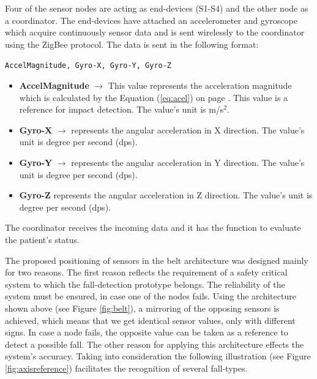 \documentclass[conference]{IEEEtran}
\theoremstyle{definition}
\begin{document}
Four of the sensor nodes are acting as end-devices (S1-S4) and the other node as a coordinator. 
The end-devices have attached an accelerometer and gyroscope which acquire continuously sensor 
data and is sent wirelessly to the coordinator using the ZigBee protocol. The data is sent in the following format:
 \begin{center}
  \texttt{AccelMagnitude, Gyro-X, Gyro-Y, Gyro-Z}
 \end{center}
\begin{itemize}
  \item \textbf{AccelMagnitude} $\rightarrow$ This value represents the acceleration magnitude which is calculated 
  by the Equation (\ref{eq:acel}) on page \pageref{eq:acel}. This value is a reference for impact detection. 
  The value's unit is m/s$^2$.
  \item \textbf{Gyro-X} $\rightarrow$ represents the angular acceleration in X direction. The value's unit is 
  degree per second (dps).
  \item \textbf{Gyro-Y} $\rightarrow$ represents the angular acceleration in Y direction. The value's unit is 
  degree per second (dps).
  \item \textbf{Gyro-Z} represents the angular acceleration in Z direction. The value's unit is degree per second (dps).
\end{itemize}
The coordinator receives the incoming data and it has the function to evaluate the patient's status.

The proposed positioning of sensors in the belt architecture was designed mainly for two reasons. The first reason 
reflects the requirement of a safety critical system to which the fall-detection prototype belongs. The reliability 
of the system must be ensured, in case one of the nodes fails. Using the architecture shown above (see Figure \ref{fig:belt}), 
a mirroring of the opposing sensors is achieved, which means that we get identical sensor values, only with different signs. 
In case a node fails, the opposite value can be taken as a reference to detect a possible fall. The other reason for 
applying this architecture effects the system's accuracy. Taking into consideration the following illustration 
(see Figure \ref{fig:axisreference}) facilitates the recognition of several fall-types.
\end{document}
